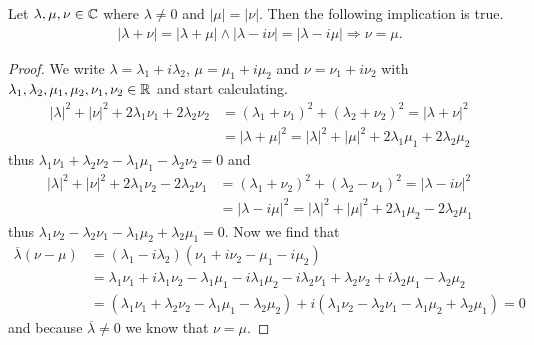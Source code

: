 \begin{lemma} \label{lemma:complex_alg}
	Let $\lambda, \mu, \nu \in \mathbb{C}$ where $\lambda \neq 0$ and $|\mu| = |\nu|$. Then the following implication is  true. 
	\begin{align*}
		|\lambda + \nu| = |\lambda + \mu| \land |\lambda - i\nu| = |\lambda - i\mu| \Rightarrow \nu = \mu.
	\end{align*}
\end{lemma}

\begin{proof}
	We write $\lambda = \lambda_1 + i \lambda_2$, $\mu = \mu_1 + i \mu_2$ and $\nu = \nu_1 + i \nu_2$ with $\lambda_1, \lambda_2, \mu_1, \mu_2, \nu_1, \nu_2 \in \mathbb{R}$ and start calculating.
	\begin{align*}
		|\lambda|^2 + |\nu|^2 + 2 \lambda_1 \nu_1 + 2 \lambda_2 \nu_2  &= (\lambda_1 + \nu_1)^2 + (\lambda_2 + \nu_2)^2 = |\lambda + \nu|^2 \\
		&= |\lambda + \mu|^2 = |\lambda|^2 + |\mu|^2 + 2 \lambda_1 \mu_1 + 2 \lambda_2 \mu_2
	\end{align*}
	thus $\lambda_1 \nu_1 + \lambda_2 \nu_2 - \lambda_1 \mu_1 - \lambda_2 \nu_2 = 0$ and
	\begin{align*}
		|\lambda|^2 + |\nu|^2 + 2 \lambda_1 \nu_2 - 2 \lambda_2 \nu_1  &= (\lambda_1 + \nu_2)^2 + (\lambda_2 - \nu_1)^2 = |\lambda - i\nu|^2 \\
		&= |\lambda - i\mu|^2 = |\lambda|^2 + |\mu|^2 + 2 \lambda_1 \mu_2 - 2 \lambda_2 \mu_1
	\end{align*}
	thus $\lambda_1 \nu_2 - \lambda_2 \nu_1 - \lambda_1 \mu_2 + \lambda_2 \mu_1 = 0$.
	Now we find that
	\begin{align*}
		\overline{\lambda}(\nu - \mu) &= (\lambda_1 - i\lambda_2)(\nu_1 + i \nu_2 - \mu_1 - i\mu_2) \\
		&= \lambda_1\nu_1 + i\lambda_1 \nu_2 - \lambda_1\mu_1 - i\lambda_1\mu_2 -i\lambda_2\nu_1 + \lambda_2\nu_2 + i\lambda_2\mu_1 - \lambda_2\mu_2 \\
		&= (\lambda_1 \nu_1 + \lambda_2\nu_2 - \lambda_1\mu_1 - \lambda_2\mu_2) + i(\lambda_1 \nu_2 - \lambda_2\nu_1 -\lambda_1\mu_2 + \lambda_2\mu_1) = 0
	\end{align*}
	and because $\overline{\lambda} \neq 0$ we know that $\nu = \mu$.
\end{proof}